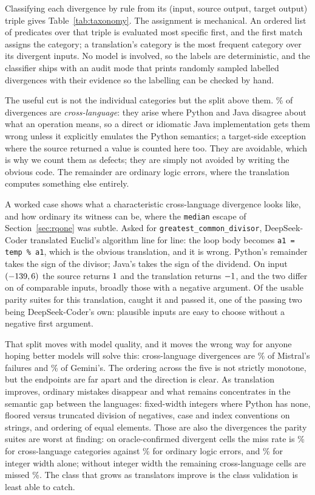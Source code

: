 \documentclass[sigconf]{acmart}
\begin{document}
Classifying each divergence by rule from its (input, source output, target output) triple gives
Table~\ref{tab:taxonomy}. The assignment is mechanical. An ordered list of predicates over that
triple is evaluated most specific first, and the first match assigns the category; a
translation's category is the most frequent category over its divergent inputs. No model is involved, so the labels
are deterministic, and the classifier ships with an audit mode that prints randomly sampled
labelled divergences with their evidence so the labelling can be checked by hand.

The useful cut is not the individual categories but the split above
them. \CrossLangShare\% of divergences are \emph{cross-language}: they arise where Python and Java
disagree about what an operation means, so a direct or idiomatic Java implementation gets them
wrong unless it explicitly emulates the Python semantics; a target-side exception where the
source returned a value is counted here too. They are avoidable, which is why we
count them as defects; they are simply not avoided by writing the obvious code. The remainder are
ordinary logic errors, where the translation computes something else entirely.

A worked case shows what a characteristic cross-language divergence looks like, and how
ordinary its witness can be, where the \texttt{median} escape of Section~\ref{sec:rqone} was
subtle. Asked for
\texttt{greatest\_common\_divisor}, DeepSeek-Coder translated Euclid's algorithm line for line:
the loop body becomes \texttt{a1 = temp \% a1}, which is the obvious translation, and it is
wrong. Python's remainder takes the sign of the divisor; Java's takes the sign of the dividend.
On input $(-139, 6)$ the source returns $1$ and the translation returns
$-1$, and the two differ on \GcdDiverge{} of \GcdComparable{} comparable inputs, broadly
those with a negative argument. Of the \GcdUsableSuites{} usable parity suites for this
translation, \GcdCaughtValidators{} caught it and \GcdPassedValidators{} passed it, one of the
passing two being DeepSeek-Coder's own: \KParity{} plausible inputs are easy to choose without
a negative first argument.

That split moves with model quality, and it moves the wrong way for anyone hoping better models
will solve this: cross-language divergences are \CrossLangMistral\% of Mistral's failures and
\CrossLangGemini\% of Gemini's. The ordering across the five is not strictly monotone, but the
endpoints are far apart and the direction is clear. As translation improves, ordinary mistakes
disappear and what remains concentrates in the semantic gap between the languages: fixed-width
integers where Python has none, floored versus truncated division of negatives, case and index
conventions on strings, and ordering of equal elements. Those are also the divergences the parity
suites are worst at finding: on oracle-confirmed divergent cells the miss rate is
\MissCrossLang\% for cross-language categories against \MissLogic\% for ordinary logic errors,
and \MissIntWidth\% for integer width alone; without integer width the remaining cross-language
cells are missed \CrossExIntMiss\%. The class that grows as translators improve is the
class validation is least able to catch.
\end{document}
